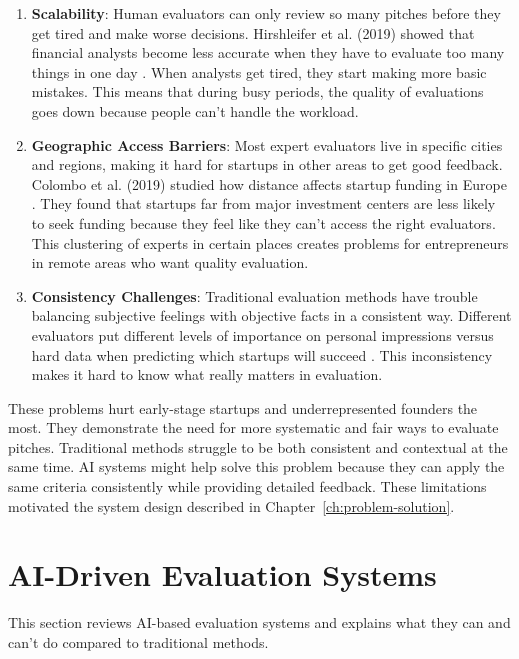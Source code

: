 \begin{enumerate}
    \item \textbf{Scalability}: Human evaluators can only review so many pitches before they get tired and make worse decisions. Hirshleifer et al. (2019) showed that financial analysts become less accurate when they have to evaluate too many things in one day \cite{Hirshleifer2019}. When analysts get tired, they start making more basic mistakes. This means that during busy periods, the quality of evaluations goes down because people can't handle the workload.

    \item \textbf{Geographic Access Barriers}: Most expert evaluators live in specific cities and regions, making it hard for startups in other areas to get good feedback. Colombo et al. (2019) studied how distance affects startup funding in Europe \cite{Colombo2019}. They found that startups far from major investment centers are less likely to seek funding because they feel like they can't access the right evaluators. This clustering of experts in certain places creates problems for entrepreneurs in remote areas who want quality evaluation.

    \item \textbf{Consistency Challenges}: Traditional evaluation methods have trouble balancing subjective feelings with objective facts in a consistent way. Different evaluators put different levels of importance on personal impressions versus hard data when predicting which startups will succeed \cite{Tsay2021VISUALSDI}. This inconsistency makes it hard to know what really matters in evaluation.
\end{enumerate}

These problems hurt early-stage startups and underrepresented founders the most. They demonstrate the need for more systematic and fair ways to evaluate pitches. Traditional methods struggle to be both consistent and contextual at the same time. AI systems might help solve this problem because they can apply the same criteria consistently while providing detailed feedback. These limitations motivated the system design described in Chapter~\ref{ch:problem-solution}.

\section{AI-Driven Evaluation Systems}
\label{sec:ai-systems}

This section reviews AI-based evaluation systems and explains what they can and can't do compared to traditional methods.

